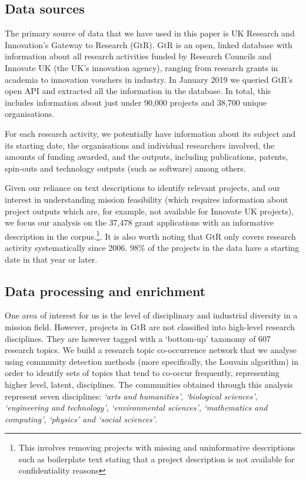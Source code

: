 \documentclass[11pt]{article}
\begin{document}
\subsection{Data sources}
\label{subsec:data}

The primary source of data that we have used in this paper is UK Research and Innovation’s Gateway to Research (GtR). GtR is an open, linked database with information about all research activities funded by Research Councils and Innovate UK (the UK’s innovation agency), ranging from research grants in academia to innovation vouchers in industry. In January 2019 we queried GtR’s open API and extracted all the information in the database. In total, this includes information about just under 90,000 projects and 38,700 unique organisations.

For each research activity, we potentially have information about its subject and its starting date, the organisations and individual researchers involved, the amounts of funding awarded, and the outputs, including publications, patents, spin-outs and technology outputs (such as software) among others.

Given our reliance on text descriptions to identify relevant projects, and our interest in understanding mission feasibility (which requires information about project outputs which are, for example, not available for Innovate UK projects),
we focus our analysis on the 37,478 grant applications with an informative description in the corpus.\footnote{This involves removing projects with missing and uninformative descriptions such as boilerplate text stating that a project description is not available for confidentiality reasons}. It is also worth noting that GtR only covers research activity systematically since 2006. 98\% of the projects in the data have a starting date in that year or later.

\subsection{Data processing and enrichment}
One area of interest for us is the level of disciplinary and industrial diversity in a mission field. However, projects in GtR are not classified into high-level research disciplines. They are however tagged with a `bottom-up’ taxonomy of 607 research topics. We build a research topic co-occurrence network that we analyse using community detection methods (more specifically, the Louvain algorithm) in order to identify sets of topics that tend to co-occur frequently, representing higher level, latent, disciplines. The communities obtained through this analysis represent seven disciplines: \emph{`arts and humanities'}, \emph{`biological sciences'}, \emph{`engineering and technology'}, \emph{`environmental sciences'}, \emph{`mathematics and computing'}, \emph{`physics' and `social sciences'}.
\end{document}

